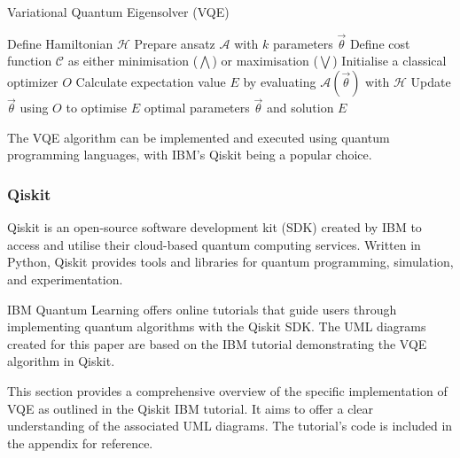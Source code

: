 \documentclass{article}
\newcounter{subsubsubsection}[subsubsection]
\begin{document}
{\begin{algorithm}[H]
\caption{Variational Quantum Eigensolver (VQE)}\label{vqe_algorithm}
\begin{algorithmic}[1]
\State Define Hamiltonian \( \mathcal{H} \)
\State Prepare ansatz \( \mathcal{A} \) with \( k \) parameters \( \overrightarrow{\theta} \)
\State Define cost function $\mathcal{C}$ as either minimisation ($\bigwedge$) or maximisation ($\bigvee$)
\State Initialise a classical optimizer \( O \)
    \State Calculate expectation value \( E \) by evaluating \( \mathcal{A}(\overrightarrow{\theta}) \) with \( \mathcal{H} \)
    \State Update \( \overrightarrow{\theta} \) using \( O \) to optimise \( E \)
\EndWhile
\State \Return optimal parameters \( \overrightarrow{\theta} \) and solution \( E \)
\end{algorithmic}
\end{algorithm}

The VQE algorithm can be implemented and executed using quantum programming languages, with IBM’s Qiskit being a popular choice.

\subsubsection{Qiskit}

Qiskit is an open-source software development kit (SDK) created by IBM to access and utilise their cloud-based quantum computing services. Written in Python, Qiskit provides tools and libraries for quantum programming, simulation, and experimentation\cite{qiskithomepage}.

IBM Quantum Learning offers online tutorials that guide users through implementing quantum algorithms with the Qiskit SDK\cite{Tutorial}. The UML diagrams created for this paper are based on the IBM tutorial demonstrating the VQE algorithm in Qiskit\cite{IBMVQETut}.


This section provides a comprehensive overview of the specific implementation of VQE as outlined in the Qiskit IBM tutorial. It aims to offer a clear understanding of the associated UML diagrams. The tutorial's code is included in the appendix for reference.

}
\end{document}
